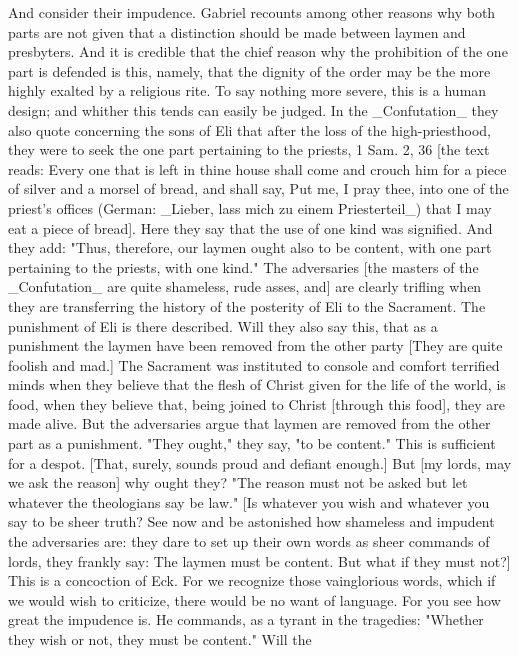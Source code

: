 And consider their impudence.  Gabriel recounts among other reasons
why both parts are not given that a distinction should be made
between laymen and presbyters.  And it is credible that the chief
reason why the prohibition of the one part is defended is this,
namely, that the dignity of the order may be the more highly exalted
by a religious rite.  To say nothing more severe, this is a human
design; and whither this tends can easily be judged.  In the
_Confutation_ they also quote concerning the sons of Eli that after
the loss of the high-priesthood, they were to seek the one part
pertaining to the priests, 1 Sam. 2, 36 [the text reads: Every one
that is left in thine house shall come and crouch him for a piece of
silver and a morsel of bread, and shall say, Put me, I pray thee,
into one of the priest's offices (German: _Lieber, lass mich zu einem
Priesterteil_) that I may eat a piece of bread].  Here they say that
the use of one kind was signified.  And they add: "Thus, therefore,
our laymen ought also to be content, with one part pertaining to the
priests, with one kind." The adversaries [the masters of the
_Confutation_ are quite shameless, rude asses, and] are clearly
trifling when they are transferring the history of the posterity of
Eli to the Sacrament.  The punishment of Eli is there described.
Will they also say this, that as a punishment the laymen have been
removed from the other party [They are quite foolish and mad.] The
Sacrament was instituted to console and comfort terrified minds when
they believe that the flesh of Christ given for the life of the world,
is food, when they believe that, being joined to Christ [through
this food], they are made alive.  But the adversaries argue that
laymen are removed from the other part as a punishment.  "They ought,"
they say, "to be content." This is sufficient for a despot.  [That,
surely, sounds proud and defiant enough.] But [my lords, may we ask
the reason] why ought they?  "The reason must not be asked but let
whatever the theologians say be law." [Is whatever you wish and
whatever you say to be sheer truth?  See now and be astonished how
shameless and impudent the adversaries are: they dare to set up their
own words as sheer commands of lords, they frankly say: The laymen
must be content.  But what if they must not?] This is a concoction of
Eck.  For we recognize those vainglorious words, which if we would
wish to criticize, there would be no want of language.  For you see
how great the impudence is.  He commands, as a tyrant in the
tragedies: "Whether they wish or not, they must be content." Will the
